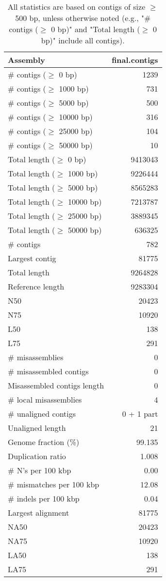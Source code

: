 \documentclass[12pt,a4paper]{article}
\begin{document}
\begin{table}[ht]
\begin{center}
\caption{All statistics are based on contigs of size $\geq$ 500 bp, unless otherwise noted (e.g., "\# contigs ($\geq$ 0 bp)" and "Total length ($\geq$ 0 bp)" include all contigs).}
\begin{tabular}{|l*{1}{|r}|}
\hline
Assembly & final.contigs \\ \hline
\# contigs ($\geq$ 0 bp) & 1239 \\ \hline
\# contigs ($\geq$ 1000 bp) & 731 \\ \hline
\# contigs ($\geq$ 5000 bp) & 500 \\ \hline
\# contigs ($\geq$ 10000 bp) & 316 \\ \hline
\# contigs ($\geq$ 25000 bp) & 104 \\ \hline
\# contigs ($\geq$ 50000 bp) & 10 \\ \hline
Total length ($\geq$ 0 bp) & 9413043 \\ \hline
Total length ($\geq$ 1000 bp) & 9226444 \\ \hline
Total length ($\geq$ 5000 bp) & 8565283 \\ \hline
Total length ($\geq$ 10000 bp) & 7213787 \\ \hline
Total length ($\geq$ 25000 bp) & 3889345 \\ \hline
Total length ($\geq$ 50000 bp) & 636325 \\ \hline
\# contigs & 782 \\ \hline
Largest contig & 81775 \\ \hline
Total length & 9264828 \\ \hline
Reference length & 9283304 \\ \hline
N50 & 20423 \\ \hline
N75 & 10920 \\ \hline
L50 & 138 \\ \hline
L75 & 291 \\ \hline
\# misassemblies & 0 \\ \hline
\# misassembled contigs & 0 \\ \hline
Misassembled contigs length & 0 \\ \hline
\# local misassemblies & 4 \\ \hline
\# unaligned contigs & 0 + 1 part \\ \hline
Unaligned length & 21 \\ \hline
Genome fraction (\%) & 99.135 \\ \hline
Duplication ratio & 1.008 \\ \hline
\# N's per 100 kbp & 0.00 \\ \hline
\# mismatches per 100 kbp & 12.08 \\ \hline
\# indels per 100 kbp & 0.04 \\ \hline
Largest alignment & 81775 \\ \hline
NA50 & 20423 \\ \hline
NA75 & 10920 \\ \hline
LA50 & 138 \\ \hline
LA75 & 291 \\ \hline
\end{tabular}
\end{center}
\end{table}
\end{document}
